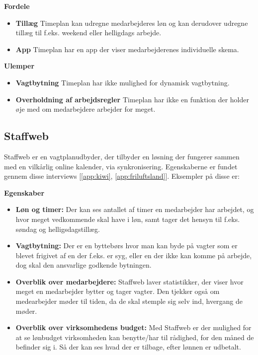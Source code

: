 \textbf{Fordele}
\begin{itemize}
\item {\textbf{Tillæg} Timeplan kan udregne medarbejderes løn og kan derudover udregne tillæg til f.eks. weekend eller helligdags arbejde.}
\item {\textbf{App} Timeplan har en app der viser medarbejderenes individuelle skema.}
\end{itemize}

\textbf{Ulemper}
\begin{itemize}
\item {\textbf{Vagtbytning} Timeplan har ikke mulighed for dynamisk vagtbytning.}
\item {\textbf{Overholdning af arbejdsregler} Timeplan har ikke en funktion der holder øje med om medarbejdere arbejder for meget.}\\
\end{itemize}

\subsection{Staffweb}

Staffweb er en vagtplanudbyder, der tilbyder en løsning der fungerer sammen med en vilkårlig online kalender, via synkronisering. Egenskaberne er fundet gennem disse interviews [\ref{app:kiwi}, \ref{app:friluftsland}]. Eksempler på disse er:

\textbf{Egenskaber} 
\begin{itemize}
    \item {\textbf{Løn og timer:} Der kan ses antallet af timer en medarbejder har arbejdet, og hvor meget vedkommende skal have i løn, samt tager det hensyn til f.eks. søndag og helligsdagstillæg.}
    \item {\textbf{Vagtbytning:} Der er en byttebørs hvor man kan byde på vagter som er blevet frigivet af en der f.eks. er syg, eller en der ikke kan komme på arbejde, dog skal den ansvarlige godkende bytningen.}
    \item {\textbf{Overblik over medarbejdere:} Staffweb laver statistikker, der viser hvor meget en medarbejder bytter og tager vagter. Den tjekker også om medearbejder møder til tiden, da de skal stemple sig selv ind, hvergang de møder.}
    \item {\textbf{Overblik over virksomhedens budget:} Med Staffweb er der mulighed for at se lønbudget virksomheden kan benytte/har til rådighed, for den måned de befinder sig i. Så der kan ses hvad der er tilbage, efter lønnen er udbetalt.}
\end{itemize}

